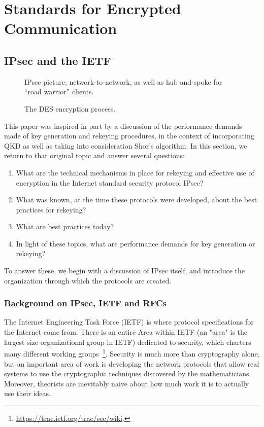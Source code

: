 \section{Standards for Encrypted Communication}

\subsection{IPsec and the IETF}
\label{sec:ipsec}
\begin{figure}
  {\color{Magenta} IPsec picture; network-to-network, as well as hub-and-spoke for ``road warrior'' clients.}
  \caption{The DES encryption process.}
  \label{fig:ipsec}
\end{figure}

This paper was inspired in part by a discussion of the performance
demands made of key generation and rekeying procedures, in the context
of incorporating QKD as well as taking into consideration Shor's
algorithm.  In this section, we return to that original topic and
answer several questions:

\begin{enumerate}
\item What are the technical mechanisms in place for rekeying and
   effective use of encryption in the Internet standard security
   protocol IPsec?
\item What was known, at the time these protocols were developed, about
   the best practices for rekeying?
 \item What are best practices today?
   \item In light of these topics, what are performance demands for
     key generation or rekeying?
\end{enumerate}

To answer these, we begin with a discussion of IPsec itself, and
introduce the organization through which the protocols are created.

\subsubsection{Background on IPsec, IETF and RFCs}

The Internet Engineering Task Force (IETF) is where protocol
specifications for the Internet come from.  There is an entire Area
within IETF (an "area" is the largest size organizational group in
IETF) dedicated to security, which charters many different working
groups~\footnote{\url{https://trac.ietf.org/trac/sec/wiki}.}.
Security is much more than cryptography alone, but an important area
of work is developing the network protocols that allow real systems to
use the cryptographic techniques discovered by the mathematicians.
Moreover, theorists are inevitably naive about how much work it is to
actually use their ideas.

